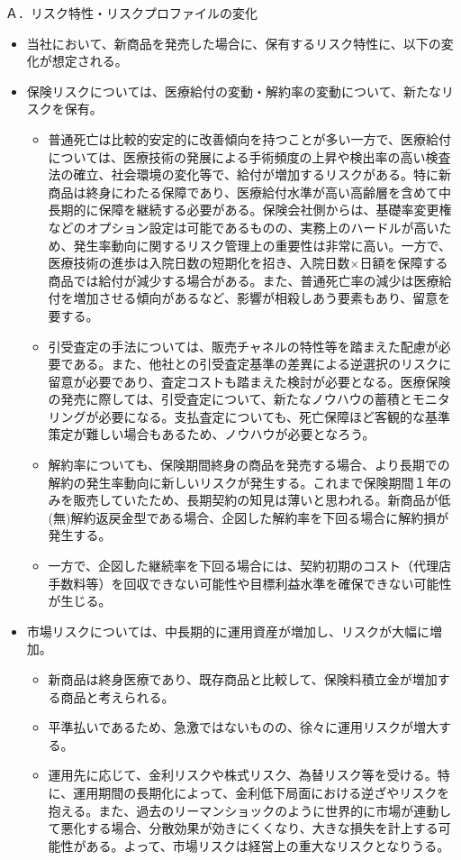 \documentclass[report,gutter=10mm,fore-edge=10mm,uplatex,dvipdfmx]{jlreq}
\begin{document}
Ａ．リスク特性・リスクプロファイルの変化

\begin{itemize}
\item[] 当社において、新商品を発売した場合に、保有するリスク特性に、以下の変化が想定される。
\item[] 保険リスクについては、医療給付の変動・解約率の変動について、新たなリスクを保有。
\begin{itemize}
\item[] 普通死亡は比較的安定的に改善傾向を持つことが多い一方で、医療給付については、医療技術の発展による手術頻度の上昇や検出率の高い検査法の確立、社会環境の変化等で、給付が増加するリスクがある。特に新商品は終身にわたる保障であり、医療給付水準が高い高齢層を含めて中長期的に保障を継続する必要がある。保険会社側からは、基礎率変更権などのオプション設定は可能であるものの、実務上のハードルが高いため、発生率動向に関するリスク管理上の重要性は非常に高い。一方で、医療技術の進歩は入院日数の短期化を招き、入院日数×日額を保障する商品では給付が減少する場合がある。また、普通死亡率の減少は医療給付を増加させる傾向があるなど、影響が相殺しあう要素もあり、留意を要する。
\item[] 引受査定の手法については、販売チャネルの特性等を踏まえた配慮が必要である。また、他社との引受査定基準の差異による逆選択のリスクに留意が必要であり、査定コストも踏まえた検討が必要となる。医療保険の発売に際しては、引受査定について、新たなノウハウの蓄積とモニタリングが必要になる。支払査定についても、死亡保障ほど客観的な基準策定が難しい場合もあるため、ノウハウが必要となろう。
\item[] 解約率についても、保険期間終身の商品を発売する場合、より長期での解約の発生率動向に新しいリスクが発生する。これまで保険期間１年のみを販売していたため、長期契約の知見は薄いと思われる。新商品が低(無)解約返戻金型である場合、企図した解約率を下回る場合に解約損が発生する。
\item[] 一方で、企図した継続率を下回る場合には、契約初期のコスト（代理店手数料等）を回収できない可能性や目標利益水準を確保できない可能性が生じる。
\end{itemize}
\item[]  市場リスクについては、中長期的に運用資産が増加し、リスクが大幅に増加。
\begin{itemize}
\item[] 新商品は終身医療であり、既存商品と比較して、保険料積立金が増加する商品と考えられる。
\item[] 平準払いであるため、急激ではないものの、徐々に運用リスクが増大する。
\item[] 運用先に応じて、金利リスクや株式リスク、為替リスク等を受ける。特に、運用期間の長期化によって、金利低下局面における逆ざやリスクを抱える。また、過去のリーマンショックのように世界的に市場が連動して悪化する場合、分散効果が効きにくくなり、大きな損失を計上する可能性がある。よって、市場リスクは経営上の重大なリスクとなりうる。

\end{itemize}
\end{itemize}
\end{document}
